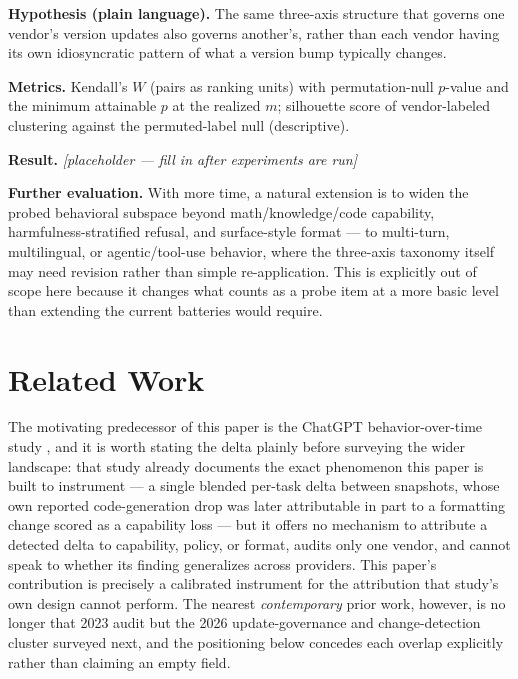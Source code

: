 \documentclass[11pt]{article}
\newcommand{\ph}{\textit{[placeholder --- fill in after experiments are run]}}
\begin{document}
\textbf{Hypothesis (plain language).} The same three-axis structure that governs one vendor's version updates also governs another's, rather than each vendor having its own idiosyncratic pattern of what a version bump typically changes.

\textbf{Metrics.} Kendall's $W$ (pairs as ranking units) with permutation-null $p$-value and the minimum attainable $p$ at the realized $m$; silhouette score of vendor-labeled clustering against the permuted-label null (descriptive).

\textbf{Result.} \ph

\vspace{0.5em}
\noindent\textbf{Further evaluation.} With more time, a natural extension is to widen the probed behavioral subspace beyond math/knowledge/code capability, harmfulness-stratified refusal, and surface-style format --- to multi-turn, multilingual, or agentic/tool-use behavior, where the three-axis taxonomy itself may need revision rather than simple re-application. This is explicitly out of scope here because it changes what counts as a probe item at a more basic level than extending the current batteries would require.

\section{Related Work}

The motivating predecessor of this paper is the ChatGPT behavior-over-time study \citep{ChatGPTBehavior2307}, and it is worth stating the delta plainly before surveying the wider landscape: that study already documents the exact phenomenon this paper is built to instrument --- a single blended per-task delta between snapshots, whose own reported code-generation drop was later attributable in part to a formatting change scored as a capability loss --- but it offers no mechanism to attribute a detected delta to capability, policy, or format, audits only one vendor, and cannot speak to whether its finding generalizes across providers. This paper's contribution is precisely a calibrated instrument for the attribution that study's own design cannot perform. The nearest \emph{contemporary} prior work, however, is no longer that 2023 audit but the 2026 update-governance and change-detection cluster surveyed next, and the positioning below concedes each overlap explicitly rather than claiming an empty field.
\end{document}

